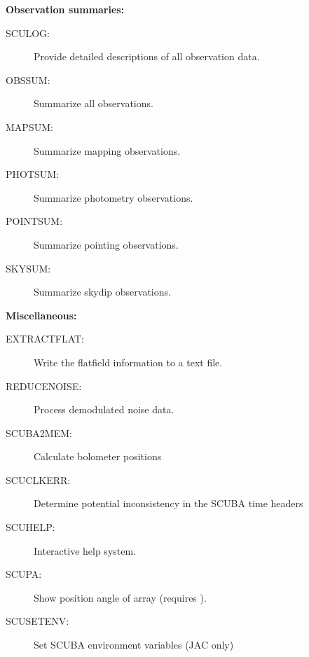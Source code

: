 \documentclass[twoside,11pt]{article}
\newcommand{\Kappa}{\xref{{\sc{Kappa}}}{sun95}{}}
\newcommand{\htmlref}[2]{#1}
\newcommand{\xref}[3]{#1}
\renewcommand{\_}{\texttt{\symbol{95}}}
\begin{document}
\begin{description}

\item \textbf{Observation summaries:}

\begin{description}

\item[\htmlref{SCULOG}{SCULOG}:] Provide detailed descriptions of all
observation  data.

\item[\htmlref{OBSSUM}{OBSSUM}:] Summarize all observations.

\item[\htmlref{MAPSUM}{MAPSUM}:] Summarize mapping observations.

\item[\htmlref{PHOTSUM}{PHOTSUM}:] Summarize photometry observations.

\item[\htmlref{POINTSUM}{POINTSUM}:] Summarize pointing observations.

\item[\htmlref{SKYSUM}{SKYSUM}:] Summarize skydip observations.

\end{description}

\item \textbf{Miscellaneous:}

\begin{description}

\item[\htmlref{EXTRACT\_FLAT}{EXTRACT_FLAT}:] Write the flatfield information
to a text file.

\item[\htmlref{REDUCE\_NOISE}{REDUCE_NOISE}:] Process demodulated noise data.

\item[\htmlref{SCUBA2MEM}{SCUBA2MEM}:] Calculate bolometer positions

\item[\htmlref{SCUCLKERR}{SCUCLKERR}:] Determine potential inconsistency in the SCUBA time headers

\item[\htmlref{SCUHELP}{SCUHELP}:] Interactive help system.

\item[\htmlref{SCUPA}{SCUPA}:] Show position angle of array (requires \Kappa).

\item[\htmlref{SCUSETENV}{SCUSETENV}:] Set SCUBA environment variables (JAC only)


\end{description}
\end{description}
\end{document}

